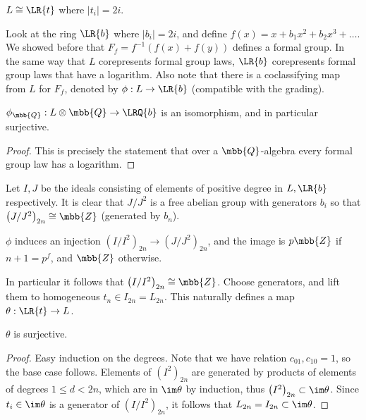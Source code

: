 \begin{theorem*}[Lazard]
	$L \cong \LR{t}$ where $\left|t_i\right| = 2i$.
\end{theorem*}

Look at the ring $\LR{b}$ where $\left|b_i\right| = 2i$,
and define $f\left(x\right) = x + b_1 x^2 + b_2 x^3 + \dotsc$.
We showed before that $F_f = f^{-1}\left(f\left(x\right) + f\left(y\right)\right)$ defines a formal group.
In the same way that $L$ corepresents formal group laws, $\LR{b}$ corepresents formal group laws that have a logarithm.
Also note that there is a coclassifying map from $L$ for $F_f$, denoted by $\phi: L \to \LR{b}$ (compatible with the grading).

\begin{lemma*}
	$\phi_\mbb{Q}: L\otimes\mbb{Q} \to \LRQ{b}$ is an isomorphism, and in particular surjective.
\end{lemma*}

\begin{proof}
	This is precisely the statement that over a $\mbb{Q}$-algebra every formal group law has a logarithm.
\end{proof}

Let $I,J$ be the ideals consisting of elements of positive degree in $L,\LR{b}$ respectively.
It is clear that $J/J^2$ is a free abelian group with generators $b_i$ so that $\left(J/J^2\right)_{2n} \cong \mbb{Z}$ (generated by $b_n$).

\begin{lemma*}
	$\phi$ induces an injection
	$\left(I/I^2\right)_{2n} \to \left(J/J^2\right)_{2n}$,
	and the image is $p\mbb{Z}$ if $n+1=p^f$, and $\mbb{Z}$ otherwise.
\end{lemma*}

In particular it follows that $\left(I/I^2\right)_{2n} \cong \mbb{Z}$.
Choose generators, and lift them to homogeneous $t_n \in I_{2n} = L_{2n}$.
This naturally defines a map $\theta: \LR{t} \to L$.

\begin{lemma*}
	$\theta$ is surjective.
\end{lemma*}

\begin{proof}
	Easy induction on the degrees.
	Note that we have relation $c_{01}, c_{10} = 1$, so the base case follows.
	Elements of $\left(I^2\right)_{2n}$ are generated by products of elements of degrees $1 \leq d < 2n$, which are in $\im \theta$ by induction, thus $\left(I^2\right)_{2n} \subset \im \theta$.
	Since $t_i \in \im \theta$ is a generator of $\left(I/I^2\right)_{2n}$, it follows that $L_{2n} = I_{2n} \subset \im \theta$.
\end{proof}


